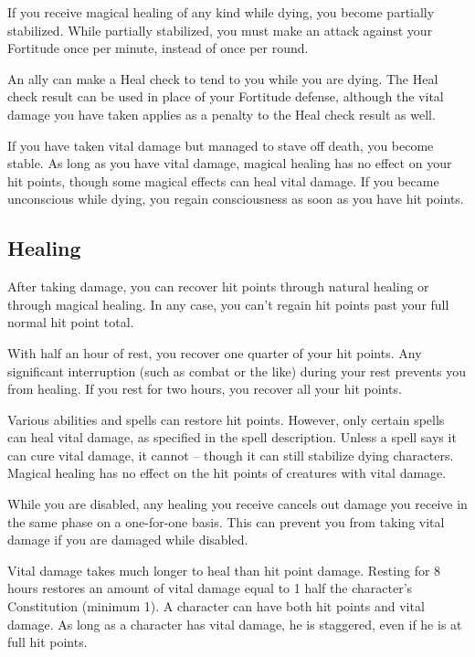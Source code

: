         If you receive magical healing of any kind while dying, you become partially stabilized.
        While partially stabilized, you must make an attack against your Fortitude once per minute, instead of once per round.

        An ally can make a Heal check to tend to you while you are dying.
        The Heal check result can be used in place of your Fortitude defense, although the vital damage you have taken applies as a penalty to the Heal check result as well.

        \label{Stable}
        If you have taken vital damage but managed to stave off death, you become stable.
        As long as you have vital damage, magical healing has no effect on your hit points, though some magical effects can heal vital damage.
        If you became unconscious while dying, you regain consciousness as soon as you have hit points.

    \subsection{Healing}
        After taking damage, you can recover hit points through natural healing or through magical healing.
        In any case, you can't regain hit points past your full normal hit point total.

         With half an hour of rest, you recover one quarter of your hit points.
        Any significant interruption (such as combat or the like) during your rest prevents you from healing.
        If you rest for two hours, you recover all your hit points.

         Various abilities and spells can restore hit points.
        However, only certain spells can heal vital damage, as specified in the spell description.
        Unless a spell says it can cure vital damage, it cannot -- though it can still stabilize dying characters.
        Magical healing has no effect on the hit points of creatures with vital damage.

         While you are disabled, any healing you receive cancels out damage you receive in the same phase on a one-for-one basis.
        This can prevent you from taking vital damage if you are damaged while disabled.

         Vital damage takes much longer to heal than hit point damage.
        Resting for 8 hours restores an amount of vital damage equal to 1 \add half the character's Constitution (minimum 1).
        A character can have both hit points and vital damage.
        As long as a character has vital damage, he is staggered, even if he is at full hit points.

